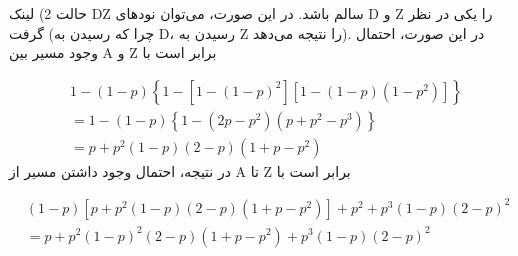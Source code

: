 \documentclass[10pt,letterpaper]{report}
\newcommand{\eqn}[1]{
\[\begin{split}
#1
\end{split}\]
}
\begin{document}
حالت 2) لینک DZ سالم باشد. در این صورت، می‌توان نودهای D و Z را یکی در نظر گرفت (چرا که رسیدن به D، رسیدن به Z را نتیجه می‌دهد). در این صورت، احتمال وجود مسیر بین A و Z برابر است با
\eqn{
&1-(1-p)\left\{1-\left[1-(1-p)^2\right]\left[1-(1-p)(1-p^2)\right]\right\}
\\&=1-(1-p)\left\{1-(2p-p^2)(p+p^2-p^3)\right\}
\\&=p+p^2(1-p)(2-p)(1+p-p^2)
}{}
در نتیجه، احتمال وجود داشتن مسیر از A تا Z برابر است با
\eqn{
&
(1-p)[p+p^2(1-p)(2-p)(1+p-p^2)]+p^2+p^3(1-p)(2-p)^2
\\&=
p+p^2(1-p)^2(2-p)(1+p-p^2)+p^3(1-p)(2-p)^2
}{}

%
%
%
%
%
%
%
%
%
%
%
%
%
%
%
%
%
%
%
%
%
%
%

\end{document}
